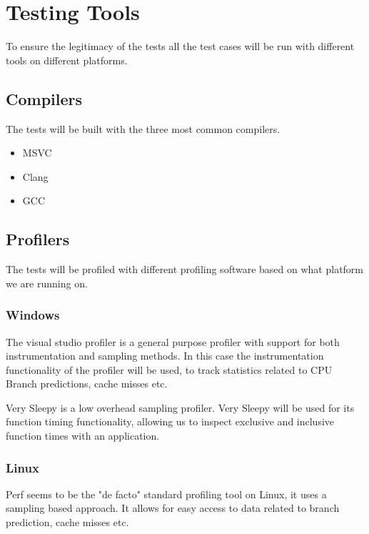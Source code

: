 \section{Testing Tools}
To ensure the legitimacy of the tests all the test cases will be run with different tools on different platforms.

\subsection{Compilers}
The tests will be built with the three most common compilers. 
\begin{itemize}

    \item
    MSVC
    
    \item
    Clang

    \item
    GCC

\end{itemize}


\subsection{Profilers}
The tests will be profiled with different profiling software based on what platform we are running on.

\subsubsection{Windows}
The visual studio profiler is a general purpose profiler with support for both instrumentation and sampling methods.
In this case the instrumentation functionality of the profiler will be used, to track statistics related to CPU Branch predictions, cache misses etc.

Very Sleepy is a low overhead sampling profiler. 
Very Sleepy will be used for its function timing functionality, allowing us to inspect exclusive and inclusive function times with an application.

\subsubsection{Linux}
Perf seems to be the "de facto" standard profiling tool on Linux, it uses a sampling based approach.
It allows for easy access to data related to branch prediction, cache misses etc. 

